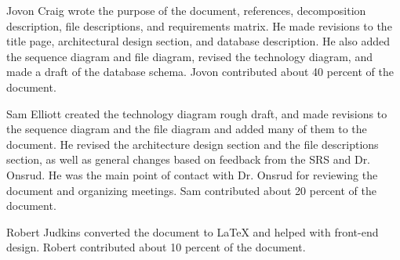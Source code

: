 \documentclass{article}
\begin{document}
Jovon Craig wrote the purpose of the document, references, decomposition description, file descriptions, and requirements matrix. He made revisions to the title page, architectural design section, and database description. He also added the sequence diagram and file diagram, revised the technology diagram, and made a draft of the database schema. Jovon contributed about 40 percent of the document.


Sam Elliott created the technology diagram rough draft, and made revisions to the sequence diagram and the file diagram and added many of them to the document. He revised the architecture design section and the file descriptions section, as well as general changes based on feedback from the SRS and Dr. Onsrud.  He was the main point of contact with Dr. Onsrud for reviewing the document and organizing meetings. Sam contributed about 20 percent of the document.

Robert Judkins converted the document to LaTeX and helped with front-end design. Robert contributed about 10 percent of the document.

\newpage



\end{document}
